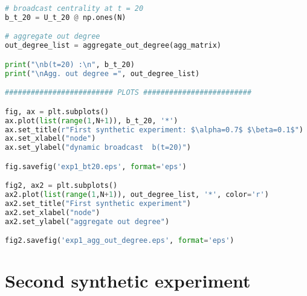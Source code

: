 \begin{lstlisting}[language=Python, caption=First synthetic experiment]
# broadcast centrality at t = 20
b_t_20 = U_t_20 @ np.ones(N)

# aggregate out degree 
out_degree_list = aggregate_out_degree(agg_matrix)

print("\nb(t=20) :\n", b_t_20)
print("\nAgg. out degree =", out_degree_list)

######################### PLOTS #########################

fig, ax = plt.subplots()
ax.plot(list(range(1,N+1)), b_t_20, '*')
ax.set_title(r"First synthetic experiment: $\alpha=0.7$ $\beta=0.1$")
ax.set_xlabel("node")
ax.set_ylabel("dynamic broadcast  b(t=20)")

fig.savefig('exp1_bt20.eps', format='eps')

fig2, ax2 = plt.subplots()
ax2.plot(list(range(1,N+1)), out_degree_list, '*', color='r')
ax2.set_title("First synthetic experiment")
ax2.set_xlabel("node")
ax2.set_ylabel("aggregate out degree")

fig2.savefig('exp1_agg_out_degree.eps', format='eps')
\end{lstlisting}

\section*{Second synthetic experiment}
\label{sec:sse}

